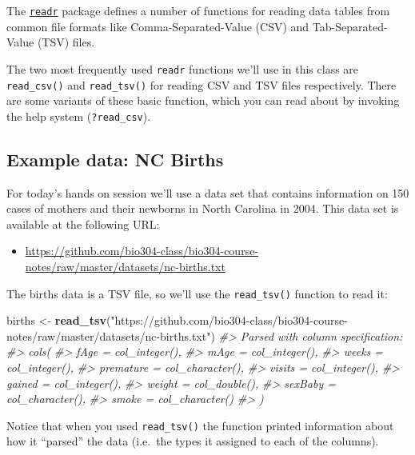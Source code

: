 \documentclass[]{book}
\newenvironment{Shaded}{\begin{snugshade}}{\end{snugshade}}
\newcommand{\CommentTok}[1]{\textcolor[rgb]{0.56,0.35,0.01}{\textit{#1}}}
\newcommand{\KeywordTok}[1]{\textcolor[rgb]{0.13,0.29,0.53}{\textbf{#1}}}
\newcommand{\NormalTok}[1]{#1}
\newcommand{\StringTok}[1]{\textcolor[rgb]{0.31,0.60,0.02}{#1}}
\providecommand{\tightlist}{%
  \setlength{\itemsep}{0pt}\setlength{\parskip}{0pt}}
\theoremstyle{definition}
\theoremstyle{definition}
\theoremstyle{definition}
\theoremstyle{remark}
\begin{document}
The \href{http://readr.tidyverse.org}{\texttt{readr}} package defines a
number of functions for reading data tables from common file formats
like Comma-Separated-Value (CSV) and Tab-Separated-Value (TSV) files.

The two most frequently used \texttt{readr} functions we'll use in this
class are \texttt{read\_csv()} and \texttt{read\_tsv()} for reading CSV
and TSV files respectively. There are some variants of these basic
function, which you can read about by invoking the help system
(\texttt{?read\_csv}).

\hypertarget{example-data-nc-births}{%
\subsection{Example data: NC Births}\label{example-data-nc-births}}

For today's hands on session we'll use a data set that contains
information on 150 cases of mothers and their newborns in North Carolina
in 2004. This data set is available at the following URL:

\begin{itemize}
\tightlist
\item
  \url{https://github.com/bio304-class/bio304-course-notes/raw/master/datasets/nc-births.txt}
\end{itemize}

The births data is a TSV file, so we'll use the \texttt{read\_tsv()}
function to read it:

\begin{Shaded}
\begin{Highlighting}[]
\NormalTok{births <-}\StringTok{ }\KeywordTok{read_tsv}\NormalTok{(}\StringTok{"https://github.com/bio304-class/bio304-course-notes/raw/master/datasets/nc-births.txt"}\NormalTok{)}
\CommentTok{#> Parsed with column specification:}
\CommentTok{#> cols(}
\CommentTok{#>   fAge = col_integer(),}
\CommentTok{#>   mAge = col_integer(),}
\CommentTok{#>   weeks = col_integer(),}
\CommentTok{#>   premature = col_character(),}
\CommentTok{#>   visits = col_integer(),}
\CommentTok{#>   gained = col_integer(),}
\CommentTok{#>   weight = col_double(),}
\CommentTok{#>   sexBaby = col_character(),}
\CommentTok{#>   smoke = col_character()}
\CommentTok{#> )}
\end{Highlighting}
\end{Shaded}

Notice that when you used \texttt{read\_tsv()} the function printed
information about how it ``parsed'' the data (i.e.~the types it assigned
to each of the columns).
\end{document}
